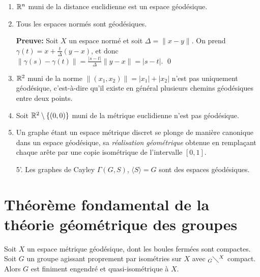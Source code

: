   \begin{exs}
    \begin{enumerate}
    \item $\mathbb{R}^n$ muni de la distance euclidienne est un espace géodésique.
    \item Tous les espaces normés sont géodésiques.

      \textbf{Preuve:} Soit $X$ un espace normé et soit $\Delta = \|x - y\|$. On prend $\gamma(t) = x +
      \frac{t}{\Delta}(y-x)$, et donc $\|\gamma(s) - \gamma(t)\| = \frac{|s-t|}{\Delta}\|y-x\| = |s-t|$. \qed

    \item $\mathbb{R}^2$ muni de la norme $\|(x_1, x_2)\| = |x_1| + |x_2|$ n'est pas uniquement géodésique,
      c'est-à-dire qu'il existe en général plusieurs chemins géodésiques entre deux points.

    \item Soit $\mathbb{R}^2 \setminus \{(0,0)\}$ muni de la métrique euclidienne n'est pas géodésique.

      
    \item Un graphe étant un espace métrique discret se plonge de manière canonique dans un espace géodésique,
      sa \emph{réalisation géométrique}  obtenue en remplaçant chaque arête par
      une copie isométrique de l'intervalle $[0,1]$.

      
    \item[5'.] Les graphes de Cayley $\Gamma(G, S)$, $\langle S \rangle = G$ sont des espaces géodésiques.
    \end{enumerate}
  \end{exs}
  
 

  \section{Théorème fondamental de la théorie géométrique des groupes}
  \label{sec:thm-fond-theorie-geom-groupes}


  \begin{theo} \label{thm:milnor-svarc} 
    Soit $X$ un espace métrique géodésique, dont les boules fermées sont compactes. Soit $G$ un groupe
    agissant proprement par isométries sur $X$ avec $_G\diagdown^X$ compact. Alors $G$ est finiment engendré
    et quasi-isométrique à $X$.
  \end{theo}


